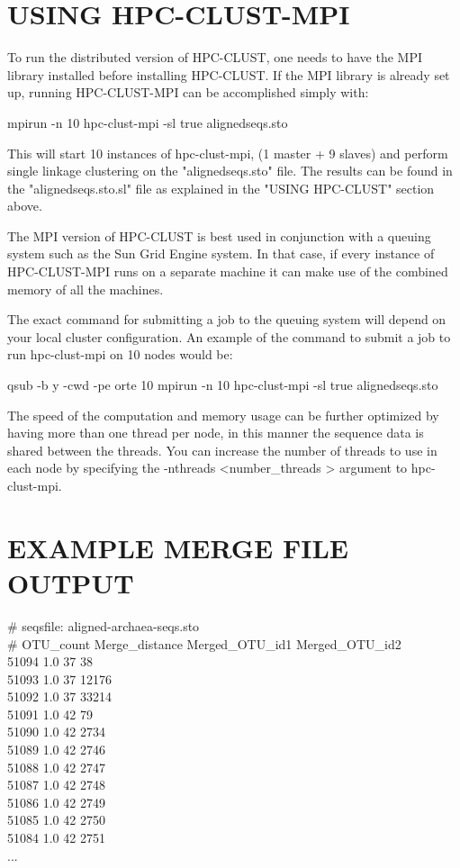 \documentclass[10pt,a4paper]{article}
\begin{document}
\section{USING HPC-CLUST-MPI}

To run the distributed version of HPC-CLUST, one needs to have the MPI library installed
before installing HPC-CLUST. If the MPI library is already set up, running HPC-CLUST-MPI
can be accomplished simply with:

mpirun -n 10 hpc-clust-mpi -sl true alignedseqs.sto

This will start 10 instances of hpc-clust-mpi, (1 master + 9 slaves) and perform single linkage
clustering on the "alignedseqs.sto" file. The results can be found in the "alignedseqs.sto.sl"
file as explained in the "USING HPC-CLUST" section above.

The MPI version of HPC-CLUST is best used in conjunction with a queuing system such as the
Sun Grid Engine system. In that case, if every instance of HPC-CLUST-MPI runs on a
separate machine it can make use of the combined memory of all the machines.

The exact command for submitting a job to the queuing system will depend on your local cluster
configuration. An example of the command to submit a job to run hpc-clust-mpi on 10 nodes would be:

qsub -b y -cwd -pe orte 10 mpirun -n 10 hpc-clust-mpi -sl true alignedseqs.sto


The speed of the computation and memory usage can be further optimized by having more than one
thread per node, in this manner the sequence data is shared between the threads. You can
increase the number of threads to use in each node by specifying the -nthreads \textless number\_threads \textgreater 
argument to hpc-clust-mpi.

\section{EXAMPLE MERGE FILE OUTPUT}

\# seqsfile: aligned-archaea-seqs.sto\\
\# OTU\_count Merge\_distance Merged\_OTU\_id1 Merged\_OTU\_id2\\
51094 1.0 37 38\\
51093 1.0 37 12176\\
51092 1.0 37 33214\\
51091 1.0 42 79\\
51090 1.0 42 2734\\
51089 1.0 42 2746\\
51088 1.0 42 2747\\
51087 1.0 42 2748\\
51086 1.0 42 2749\\
51085 1.0 42 2750\\
51084 1.0 42 2751\\
...
\end{document}
